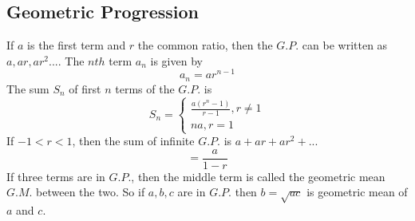 \documentclass[twocolumn, 10pt]{article}
\begin{document}
\subsection{Geometric Progression}
If $a$ is the first term and $r$ the common ratio, then the $G.P.$ can be written as $a,ar,ar^2...$. The $nth$ term $a_n$ is given by 
$$a_n=ar^{n-1}$$ The sum $S_n$ of first $n$ terms of the $G.P.$ is 
$$S_n=
\begin{cases}
  \frac{a(r^n -1)}{r-1}, r \not= 1 \\
   na,r=1\
\end{cases} $$ If $-1<r<1$, then the sum of infinite $G.P.$ is $a+ar+ar^2+...$ $$=\frac{a}{1-r}$$
If three terms are in $G.P.$, then the middle term is called the geometric mean $G.M.$ between the two. So if $a,b,c$ are in $G.P.$ then  $b=\sqrt{ac}$ is geometric mean of $a$ and $c$.
\end{document}
